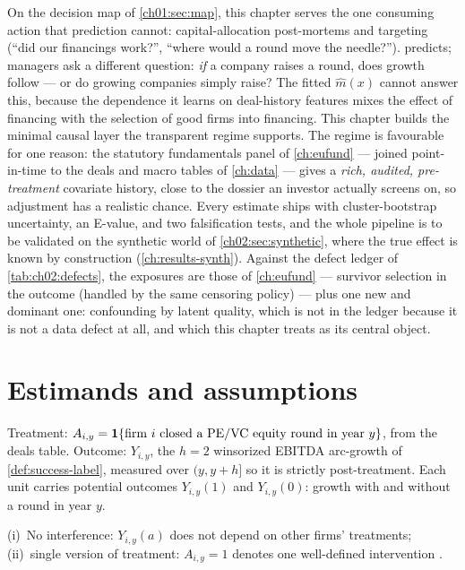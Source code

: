 
On the decision map of \cref{ch01:sec:map}, this chapter serves the one consuming action that
prediction cannot: capital-allocation post-mortems and targeting (``did our financings work?'',
``where would a round move the needle?'').  predicts; managers ask a different
question: \emph{if} a company raises a round, does growth follow --- or do growing companies
simply raise? The fitted $\hat m(x)$ cannot answer this, because the dependence it learns on
deal-history features mixes the effect of financing with the selection of good firms into
financing. This chapter builds the minimal causal layer the transparent regime supports. The
regime is favourable for one reason: the statutory fundamentals panel of \cref{ch:eufund} ---
joined point-in-time to the deals and macro tables of \cref{ch:data} --- gives a \emph{rich,
audited, pre-treatment} covariate history, close to the dossier an investor actually screens
on, so adjustment has a realistic chance. Every estimate ships with cluster-bootstrap
uncertainty, an E-value, and two falsification tests, and the whole pipeline is to be validated
on the synthetic world of \cref{ch02:sec:synthetic}, where the true effect is known by
construction (\cref{ch:results-synth}). Against the
defect ledger of \cref{tab:ch02:defects}, the exposures are those of \cref{ch:eufund} ---
survivor selection in the outcome (handled by the same censoring policy) --- plus one new and
dominant one: confounding by latent quality, which is not in the ledger because it is not a data
defect at all, and which this chapter treats as its central object.

\section{Estimands and assumptions}\label{chca:sec:estimands}

Treatment: $A_{i,y} = \mathbf{1}\{\text{firm } i \text{ closed a PE/VC equity round in year } y\}$, from
the deals table. Outcome: $Y_{i,y}$, the $h=2$ winsorized EBITDA arc-growth of
\cref{def:success-label}, measured over $(y, y+h]$ so it is strictly post-treatment. Each unit
carries potential outcomes $Y_{i,y}(1)$ and $Y_{i,y}(0)$: growth with and without a round in
year $y$.

\begin{assumption}[SUTVA]\label{ass:causal-sutva}
(i)~No interference: $Y_{i,y}(a)$ does not depend on other firms' treatments; (ii)~single
version of treatment: $A_{i,y}=1$ denotes one well-defined intervention \citep{imbens2015}.
\end{assumption}

